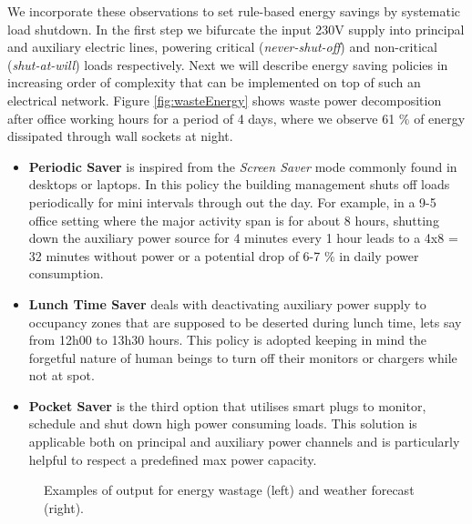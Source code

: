 We incorporate these observations to set rule-based energy savings by systematic load shutdown. In the first step we bifurcate the input 230V supply into principal and auxiliary electric lines, powering critical (\textit{never-shut-off}) and non-critical (\textit{shut-at-will}) loads respectively. Next we will describe energy saving policies in increasing order of complexity that can be implemented on top of such an electrical network. Figure \ref{fig:wasteEnergy} shows waste power decomposition after office working hours for a period of 4 days, where we observe 61 $\%$ of energy dissipated through wall sockets at night.  
\begin{itemize}
    \item \textbf{Periodic Saver} is inspired from the \textit{Screen Saver} mode commonly found in desktops or laptops. In this policy the building management shuts off loads periodically for mini intervals through out the day. For example, in a 9-5 office setting where the major activity span is for about 8 hours, shutting down the auxiliary power source for 4 minutes every 1 hour leads to a 4x8 = 32 minutes without power or a potential drop of 6-7 $\%$ in daily power consumption.   
    \item \textbf{Lunch Time Saver} deals with deactivating auxiliary power supply to occupancy zones that are supposed to be deserted during lunch time, lets say from 12h00 to 13h30 hours. This policy is adopted keeping in mind the forgetful nature of human beings to turn off their monitors or chargers while not at spot.
    \item \textbf{Pocket Saver} is the third option that utilises smart plugs to monitor, schedule and shut down high power consuming loads. This solution is applicable both on principal and auxiliary power channels and is particularly helpful to respect a predefined max power capacity.
\end{itemize}


\begin{figure}[t!]
\centering
{}\hfill
{}
\caption{Examples of output for energy wastage (left) and weather forecast (right).}
\end{figure} 



